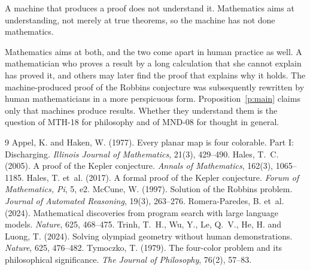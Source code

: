 \documentclass{situationist-preprint}
\begin{document}
\begin{objection}[Understanding]
A machine that produces a proof does not understand it. Mathematics aims at understanding, not merely at true theorems, so the machine has not done mathematics.
\end{objection}

\begin{reply}
Mathematics aims at both, and the two come apart in human practice as well. A mathematician who proves a result by a long calculation that she cannot explain has proved it, and others may later find the proof that explains why it holds. The machine-produced proof of the Robbins conjecture was subsequently rewritten by human mathematicians in a more perspicuous form. Proposition~\ref{p:main} claims only that machines produce results. Whether they understand them is the question of MTH-18 for philosophy and of MND-08 for thought in general.
\end{reply}

\begin{thebibliography}{9}\small
{} Appel, K. and Haken, W. (1977). Every planar map is four colorable. Part I: Discharging. \emph{Illinois Journal of Mathematics}, 21(3), 429--490.
 Hales, T.~C. (2005). A proof of the Kepler conjecture. \emph{Annals of Mathematics}, 162(3), 1065--1185.
 Hales, T. et~al. (2017). A formal proof of the Kepler conjecture. \emph{Forum of Mathematics, Pi}, 5, e2.
 McCune, W. (1997). Solution of the Robbins problem. \emph{Journal of Automated Reasoning}, 19(3), 263--276.
 Romera-Paredes, B. et~al. (2024). Mathematical discoveries from program search with large language models. \emph{Nature}, 625, 468--475.
 Trinh, T.~H., Wu, Y., Le, Q.~V., He, H. and Luong, T. (2024). Solving olympiad geometry without human demonstrations. \emph{Nature}, 625, 476--482.
 Tymoczko, T. (1979). The four-color problem and its philosophical significance. \emph{The Journal of Philosophy}, 76(2), 57--83.
\end{thebibliography}
\end{document}
